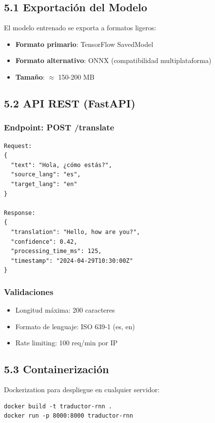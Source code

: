 \documentclass[12pt,a4paper]{article}
\begin{document}
\subsection{5.1 Exportación del Modelo}

El modelo entrenado se exporta a formatos ligeros:
\begin{itemize}
    \item \textbf{Formato primario}: TensorFlow SavedModel
    \item \textbf{Formato alternativo}: ONNX (compatibilidad multiplataforma)
    \item \textbf{Tamaño}: $\approx$ 150-200 MB
\end{itemize}

\subsection{5.2 API REST (FastAPI)}

\subsubsection{Endpoint: POST /translate}
\begin{lstlisting}
Request:
{
  "text": "Hola, ¿cómo estás?",
  "source_lang": "es",
  "target_lang": "en"
}

Response:
{
  "translation": "Hello, how are you?",
  "confidence": 0.42,
  "processing_time_ms": 125,
  "timestamp": "2024-04-29T10:30:00Z"
}
\end{lstlisting}

\subsubsection{Validaciones}
\begin{itemize}
    \item Longitud máxima: 200 caracteres
    \item Formato de lenguaje: ISO 639-1 (es, en)
    \item Rate limiting: 100 req/min por IP
\end{itemize}

\subsection{5.3 Containerización}

Dockerization para despliegue en cualquier servidor:
\begin{lstlisting}
docker build -t traductor-rnn .
docker run -p 8000:8000 traductor-rnn
\end{lstlisting}
\end{document}
